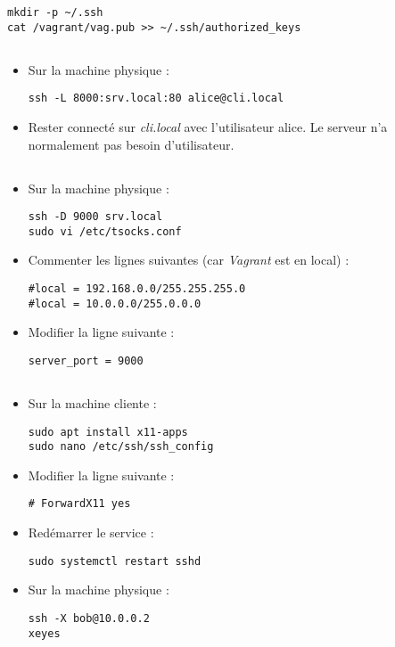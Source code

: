 \documentclass{article}
\begin{document}
\begin{lstlisting}
mkdir -p ~/.ssh
cat /vagrant/vag.pub >> ~/.ssh/authorized_keys
\end{lstlisting}

\subsection{}

\begin{itemize}
\item Sur la machine physique :
\begin{lstlisting}
ssh -L 8000:srv.local:80 alice@cli.local
\end{lstlisting}
\item Rester connecté sur \emph{cli.local} avec l’utilisateur alice. Le serveur n’a normalement pas besoin d’utilisateur.
\end{itemize}

\subsection{}

\begin{itemize}
\item Sur la machine physique :
\begin{lstlisting}
ssh -D 9000 srv.local
sudo vi /etc/tsocks.conf
\end{lstlisting}
\item Commenter les lignes suivantes (car \emph{Vagrant} est en local) :
\begin{lstlisting}
#local = 192.168.0.0/255.255.255.0
#local = 10.0.0.0/255.0.0.0
\end{lstlisting}
\item Modifier la ligne suivante :
\begin{lstlisting}
server_port = 9000
\end{lstlisting}
\end{itemize}

\subsection{}

\begin{itemize}
\item Sur la machine cliente :
\begin{lstlisting}
sudo apt install x11-apps
sudo nano /etc/ssh/ssh_config
\end{lstlisting}
\item Modifier la ligne suivante :
\begin{lstlisting}
# ForwardX11 yes
\end{lstlisting}
\item Redémarrer le service :
\begin{lstlisting}
sudo systemctl restart sshd
\end{lstlisting}
\item Sur la machine physique :
\begin{lstlisting}
ssh -X bob@10.0.0.2
xeyes
\end{lstlisting}
\end{itemize}
\end{document}
